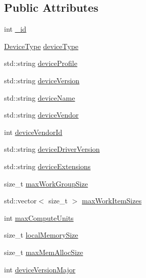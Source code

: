 \subsection*{Public Attributes}
\begin{DoxyCompactItemize}
\item 
int \hyperlink{structcv_1_1ocl_1_1DeviceInfo_ada03ba0f71aa2c5d7e118e487734bd42}{\-\_\-id}
\item 
\hyperlink{namespacecv_1_1ocl_ab965d48273d9ddc69bcb0fbd2d7de77e}{Device\-Type} \hyperlink{structcv_1_1ocl_1_1DeviceInfo_a14e175a55a952861c4074f340a344b54}{device\-Type}
\item 
std\-::string \hyperlink{structcv_1_1ocl_1_1DeviceInfo_ad4042919739df269cc86d35a33812b21}{device\-Profile}
\item 
std\-::string \hyperlink{structcv_1_1ocl_1_1DeviceInfo_a5366b8eff9a597c3ca8b83d24ea1ca4e}{device\-Version}
\item 
std\-::string \hyperlink{structcv_1_1ocl_1_1DeviceInfo_ab128a97556a5c0379faa2b8a1cfb695a}{device\-Name}
\item 
std\-::string \hyperlink{structcv_1_1ocl_1_1DeviceInfo_a7f46727eded8de8b8a03fea5f0a21b93}{device\-Vendor}
\item 
int \hyperlink{structcv_1_1ocl_1_1DeviceInfo_a50c7d35b629387beaaa66801355508fc}{device\-Vendor\-Id}
\item 
std\-::string \hyperlink{structcv_1_1ocl_1_1DeviceInfo_a05b7822c3e55db9455e4cbfdab1d88f4}{device\-Driver\-Version}
\item 
std\-::string \hyperlink{structcv_1_1ocl_1_1DeviceInfo_a274f78ac33e46288975b1f6f3d53c62c}{device\-Extensions}
\item 
size\-\_\-t \hyperlink{structcv_1_1ocl_1_1DeviceInfo_a269ef58aa2c06838ce1b7b1c12ef743f}{max\-Work\-Group\-Size}
\item 
std\-::vector$<$ size\-\_\-t $>$ \hyperlink{structcv_1_1ocl_1_1DeviceInfo_a553c8db901e05768180ce01c504bb99b}{max\-Work\-Item\-Sizes}
\item 
int \hyperlink{structcv_1_1ocl_1_1DeviceInfo_aad1eca91c0a58ed37c3f3951086913d0}{max\-Compute\-Units}
\item 
size\-\_\-t \hyperlink{structcv_1_1ocl_1_1DeviceInfo_a05917b8ee77aa831c4951124f500a8fe}{local\-Memory\-Size}
\item 
size\-\_\-t \hyperlink{structcv_1_1ocl_1_1DeviceInfo_a9f43656b5906aaeed00fd9418608e67b}{max\-Mem\-Alloc\-Size}
\item 
int \hyperlink{structcv_1_1ocl_1_1DeviceInfo_a2e0ec3aacffcfcf9e7274adcbb15ada7}{device\-Version\-Major}

\end{DoxyCompactItemize}
